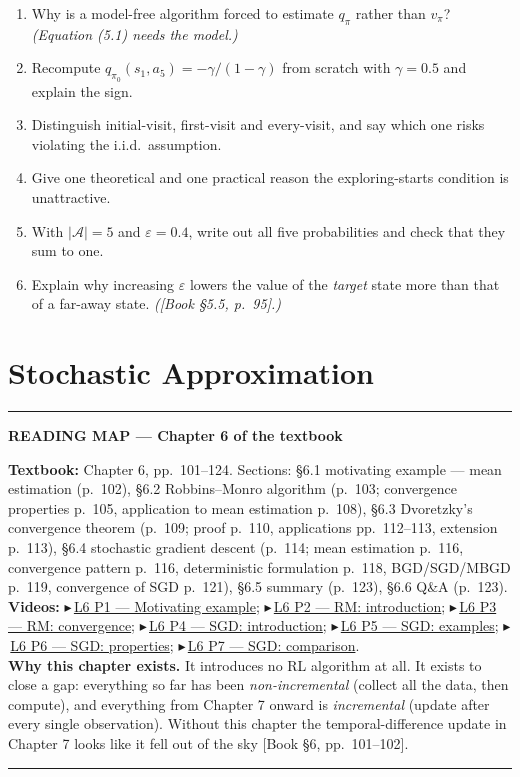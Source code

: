 \documentclass[11pt, letterpaper]{article}
\theoremstyle{runin}
\theoremstyle{runinplain}
\theoremstyle{remark}
\newcommand{\Aspace}{\mathcal{A}}
\newcommand{\bkin}[1]{{\color{bookblue}\small[\textsf{Book #1}]}}
\newcommand{\vid}[2]{{\color{vidred}\small$\playbutton$\,\href{#2}{\textsf{#1}}}}
\newcommand{\playbutton}{\blacktriangleright}
\newenvironment{roadmap}[1]
  {\par\medskip\noindent\rule{\textwidth}{0.9pt}\par\nobreak\vspace{0.25em}
   \noindent\textbf{\small READING MAP --- #1}\par\nobreak\vspace{0.15em}
   \small}
  {\par\nobreak\vspace{0.25em}\noindent\rule{\textwidth}{0.9pt}\par\medskip}
\begin{document}
\begin{enumerate}
  \item Why is a model-free algorithm forced to estimate $q_\pi$ rather than
        $v_\pi$? \emph{(Equation (5.1) needs the model.)}
  \item Recompute $q_{\pi_0}(s_1,a_5)=-\gamma/(1-\gamma)$ from scratch with
        $\gamma=0.5$ and explain the sign.
  \item Distinguish initial-visit, first-visit and every-visit, and say which one
        risks violating the i.i.d.\ assumption.
  \item Give one theoretical and one practical reason the exploring-starts
        condition is unattractive.
  \item With $|\Aspace|=5$ and $\varepsilon=0.4$, write out all five probabilities
        and check that they sum to one.
  \item Explain why increasing $\varepsilon$ lowers the value of the \emph{target}
        state more than that of a far-away state. \emph{(\bkin{\S5.5, p.~95}.)}
\end{enumerate}

\newpage
\section{Stochastic Approximation}

\begin{roadmap}{Chapter 6 of the textbook}
\textbf{Textbook:} Chapter 6, pp.~101--124. Sections: \S6.1 motivating example ---
mean estimation (p.~102), \S6.2 Robbins--Monro algorithm (p.~103; convergence
properties p.~105, application to mean estimation p.~108), \S6.3 Dvoretzky's
convergence theorem (p.~109; proof p.~110, applications pp.~112--113, extension
p.~113), \S6.4 stochastic gradient descent (p.~114; mean estimation p.~116,
convergence pattern p.~116, deterministic formulation p.~118, BGD/SGD/MBGD p.~119,
convergence of SGD p.~121), \S6.5 summary (p.~123), \S6.6 Q\&A (p.~123).\\[0.3em]
\textbf{Videos:}
\vid{L6 P1 --- Motivating example}{https://www.youtube.com/watch?v=1bMgejvWoAo};
\vid{L6 P2 --- RM: introduction}{https://www.youtube.com/watch?v=1FTGcNUUnCE};
\vid{L6 P3 --- RM: convergence}{https://www.youtube.com/watch?v=juNDoAFEre4};
\vid{L6 P4 --- SGD: introduction}{https://www.youtube.com/watch?v=EZO7Iadp5m4};
\vid{L6 P5 --- SGD: examples}{https://www.youtube.com/watch?v=BsxU_4qvvNA};
\vid{L6 P6 --- SGD: properties}{https://www.youtube.com/watch?v=fWxX9YuEHjE};
\vid{L6 P7 --- SGD: comparison}{https://www.youtube.com/watch?v=yNEV2cLKuzU}.\\[0.3em]
\textbf{Why this chapter exists.} It introduces no RL algorithm at all. It exists to
close a gap: everything so far has been \emph{non-incremental} (collect all the
data, then compute), and everything from Chapter 7 onward is \emph{incremental}
(update after every single observation). Without this chapter the
temporal-difference update in Chapter 7 looks like it fell out of the sky
\bkin{\S6, pp.~101--102}.
\end{roadmap}
\end{document}
